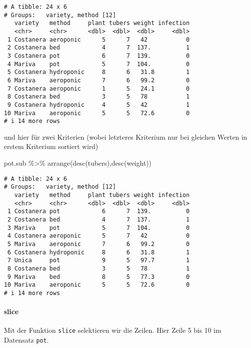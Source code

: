 \documentclass[
  letterpaper,
  DIV=11,
  numbers=noendperiod]{scrartcl}
\let\oldparagraph\paragraph
\renewcommand{\paragraph}[1]{\oldparagraph{#1}\mbox{}}
\newenvironment{Shaded}{\begin{snugshade}}{\end{snugshade}}
\newcommand{\FunctionTok}[1]{\textcolor[rgb]{0.28,0.35,0.67}{#1}}
\newcommand{\NormalTok}[1]{\textcolor[rgb]{0.00,0.23,0.31}{#1}}
\newcommand{\SpecialCharTok}[1]{\textcolor[rgb]{0.37,0.37,0.37}{#1}}
\begin{document}
\begin{verbatim}
# A tibble: 24 x 6
# Groups:   variety, method [12]
   variety   method     plant tubers weight infection
   <chr>     <chr>      <dbl>  <dbl>  <dbl>     <dbl>
 1 Costanera aeroponic      5      7   42           0
 2 Costanera bed            4      7  137.          1
 3 Costanera pot            6      7  139.          0
 4 Mariva    pot            5      7  104.          0
 5 Costanera hydroponic     8      6   31.8         1
 6 Mariva    aeroponic      7      6   99.2         0
 7 Costanera aeroponic      1      5   24.1         0
 8 Costanera bed            3      5   78           1
 9 Costanera hydroponic     4      5   42           1
10 Mariva    aeroponic      5      5   72.6         0
# i 14 more rows
\end{verbatim}

und hier für zwei Kriterien (wobei letzteres Kriterium nur bei gleichen
Werten in erstem Kriterium sortiert wird)

\begin{Shaded}
\begin{Highlighting}[]
\NormalTok{pot.sub }\SpecialCharTok{\%\textgreater{}\%} \FunctionTok{arrange}\NormalTok{(}\FunctionTok{desc}\NormalTok{(tubers),}\FunctionTok{desc}\NormalTok{(weight))}
\end{Highlighting}
\end{Shaded}

\begin{verbatim}
# A tibble: 24 x 6
# Groups:   variety, method [12]
   variety   method     plant tubers weight infection
   <chr>     <chr>      <dbl>  <dbl>  <dbl>     <dbl>
 1 Costanera pot            6      7  139.          0
 2 Costanera bed            4      7  137.          1
 3 Mariva    pot            5      7  104.          0
 4 Costanera aeroponic      5      7   42           0
 5 Mariva    aeroponic      7      6   99.2         0
 6 Costanera hydroponic     8      6   31.8         1
 7 Unica     pot            9      5   97.7         1
 8 Costanera bed            3      5   78           1
 9 Mariva    bed            8      5   77.3         0
10 Mariva    aeroponic      5      5   72.6         0
# i 14 more rows
\end{verbatim}

\hypertarget{slice}{%
\paragraph{slice}\label{slice}}

Mit der Funktion \texttt{slice} selektieren wir die Zeilen. Hier Zeile 5
bis 10 im Datensatz \texttt{pot}.
\end{document}
